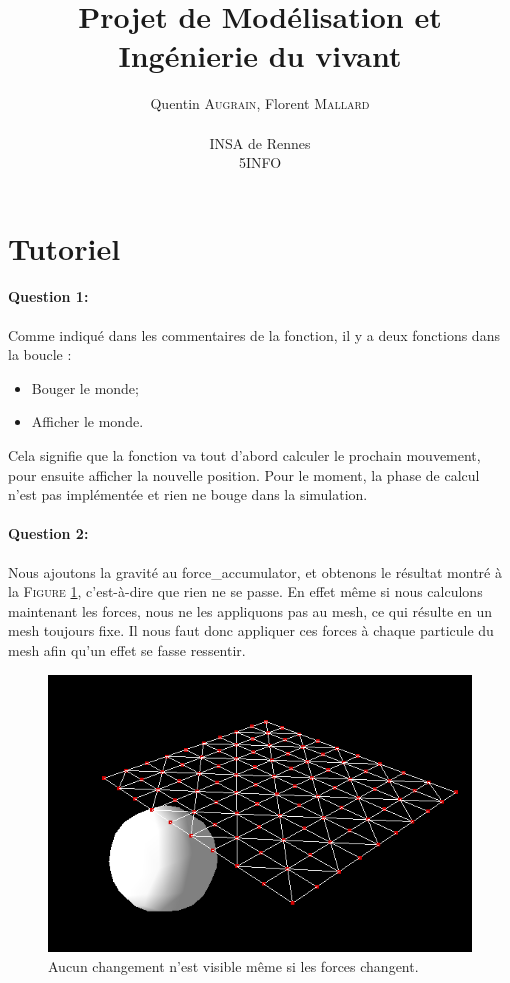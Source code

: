 \documentclass[a4paper,12pt]{article}
\author{
  Quentin \textsc{Augrain}, Florent \textsc{Mallard} \\ \\
  INSA de Rennes \\
  5INFO
}
\title{Projet de Modélisation et Ingénierie du vivant}
\begin{document}
\maketitle

\section{Tutoriel}

\paragraph{Question 1:} Comme indiqué dans les commentaires de la fonction, il y a deux fonctions dans la boucle :
\begin{itemize}
    \item Bouger le monde;
    \item Afficher le monde.
\end{itemize}

Cela signifie que la fonction va tout d'abord calculer le prochain mouvement, pour ensuite afficher la nouvelle position. Pour le moment, la phase de calcul n'est pas implémentée et rien ne bouge dans la simulation.

\paragraph{Question 2:} Nous ajoutons la gravité au \og{}force\_accumulator\fg{}, et obtenons le résultat montré à la \textsc{Figure} \ref{fig:q2}, c'est-à-dire que rien ne se passe. En effet même si nous calculons maintenant les forces, nous ne les appliquons pas au mesh, ce qui résulte en un mesh toujours fixe. Il nous faut donc appliquer ces forces à chaque particule du mesh afin qu'un effet se fasse ressentir.
\begin{figure}
  \centering
  \includegraphics{images/q2.png}
  \caption{Aucun changement n'est visible même si les forces changent.}
  \label{fig:q2}
\end{figure}
\end{document}
